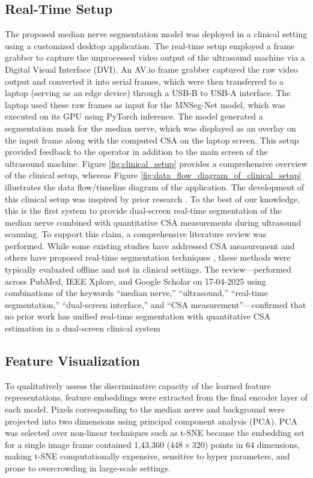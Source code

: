 \subsection{Real-Time Setup}
The proposed median nerve segmentation model was deployed in a clinical setting using a customized desktop application. The real-time setup employed a frame grabber to capture the unprocessed video output of the ultrasound machine via a Digital Visual Interface (DVI). An AV.io frame grabber \cite{epiphan} captured the raw video output and converted it into serial frames, which were then transferred to a laptop (serving as an edge device) through a USB-B to USB-A interface. The laptop used these raw frames as input for the MNSeg-Net model, which was executed on its GPU using PyTorch inference. The model generated a segmentation mask for the median nerve, which was displayed as an overlay on the input frame along with the computed CSA on the laptop screen. This setup provided feedback to the operator in addition to the main screen of the ultrasound machine. Figure \ref{fig:clinical_setup} provides a comprehensive overview of the clinical setup, whereas Figure \ref{fig:data_flow_diagram_of_clinical_setup} illustrates the data flow/timeline diagram of the application. The development of this clinical setup was inspired by prior research \cite{van2018quantitative}. To the best of our knowledge, this is the first system to provide dual-screen real-time segmentation of the median nerve combined with quantitative CSA measurements during ultrasound scanning. To support this claim, a comprehensive literature review was performed. While some existing studies have addressed CSA measurement \cite{smerilli2022development} and others have proposed real-time segmentation techniques \cite{yeh2023real}, these methods were typically evaluated offline and not in clinical settings. The review—performed across PubMed, IEEE Xplore, and Google Scholar on 17-04-2025 using combinations of the keywords “median nerve,” “ultrasound,” “real-time segmentation,” “dual-screen interface,” and “CSA measurement”—confirmed that no prior work has unified real-time segmentation with quantitative CSA estimation in a dual-screen clinical system







\subsection{Feature Visualization}
\noindent
To qualitatively assess the discriminative capacity of the learned feature representations, feature embeddings were extracted from the final encoder layer of each model. Pixels corresponding to the median nerve and background were projected into two dimensions using principal component analysis (PCA). PCA was selected over non-linear techniques such as t-SNE because the embedding set for a single image frame contained 1,43,360 ($448 \times 320$) points in 64 dimensions, making t-SNE computationally expensive, sensitive to hyper parameters, and prone to overcrowding in large-scale settings. 

